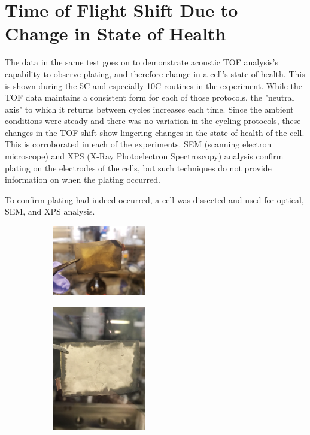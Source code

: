 
\section{Time of Flight Shift Due to Change in State of Health}
The data in the same test goes on to demonstrate acoustic TOF analysis's capability to observe plating, and therefore change in a cell's state of health. This is shown during the 5C and especially 10C routines in the experiment. 
While the TOF data maintains a consistent form for each of those protocols, the "neutral axis" to which it returns between cycles increases each time. 
Since the ambient conditions were steady and there was no variation in the cycling protocols, these changes in the TOF shift show lingering changes in the state of health of the cell. 
This is corroborated in each of the experiments. 
SEM (scanning electron microscope) and XPS (X-Ray Photoelectron Spectroscopy) analysis confirm plating on the electrodes of the cells, but such techniques do not provide information on when the plating occurred. 

To confirm plating had indeed occurred, a cell was dissected and used for optical, SEM, and XPS analysis.

\begin{figure}[t!]\label{fig:optical}
\centering
\caption{Cells cut open after experiencing 5C and zero (left) or one (center) 10C cycles. The dark regions are the graphite electrode, and the light regions lithiation.}
     \begin{subfigure}
         \centering
         \includegraphics[width=0.45\textwidth]{optical5c.JPG}
     \end{subfigure}
     \hfill
     \begin{subfigure}
         \centering
         \includegraphics[width=0.45\textwidth]{optical.JPG}
     \end{subfigure}
\end{figure}

